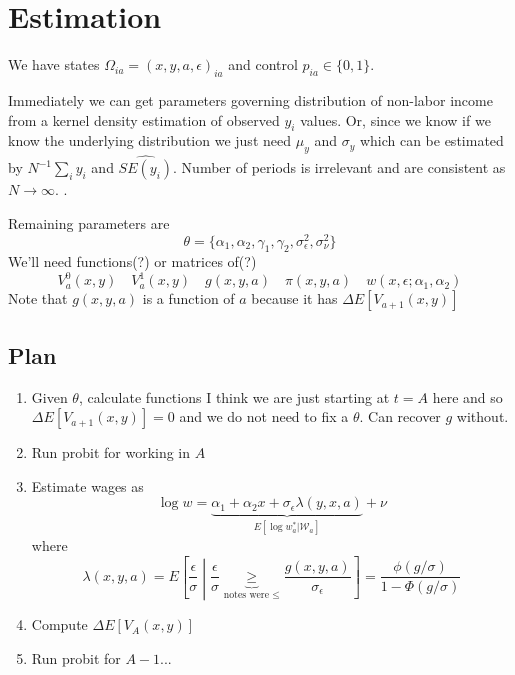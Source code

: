 \documentclass[11pt,letterpaper]{article}
\begin{document}
\section{Estimation}

We have states $\Omega_{ia} = (x,y,a,\epsilon)_{ia}$ and control $p_{ia} \in \{0,1\}$. 

Immediately we can get parameters governing distribution of non-labor income from a kernel density estimation of observed $y_i$ values. Or, since we know if we know the underlying distribution we just need $\mu_y$ and $\sigma_y$ which can be estimated by $N^{-1}\sum\nolimits_i y_i$ and $\widehat{SE(y_i)}$. Number of periods is irrelevant and are consistent as $N\rightarrow \infty$. .

Remaining parameters are
\[
\theta = \{ \alpha_1, \alpha_2, \gamma_1, \gamma_2, \sigma_\epsilon^2, \sigma^2_\nu \}
\]
We'll need functions(?) or matrices of(?)
\[
V_a^0(x,y) \quad V_a^1(x,y) \quad g(x,y,a) \quad \pi(x,y,a) \quad w(x,\epsilon; \alpha_1, \alpha_2)
\]
Note that $g(x,y,a)$ is a function of $a$ because it has $\Delta E[V_{a+1}(x,y)]$

\subsection{Plan}
\begin{enumerate}
    \item Given $\theta$, calculate functions {\color{cyan} I think we are just starting at $t=A$ here and so $\Delta E[V_{a+1}(x,y)] = 0$ and we do not need to fix a $\theta$. Can recover $g$ without.}
    \item Run probit for working in $A$
    \item Estimate wages as 
    \[
        \log w = \underbrace{\alpha_1 + \alpha_2 x + \sigma_\epsilon \lambda(y,x,a)}_{E[\log w_a^* | \mathcal W_a]} + \nu
    \] 
    where
    \[
        \lambda(x,y,a) = E\left[\frac{\epsilon}{\sigma} \middle | \frac{\epsilon}{\sigma} \underbrace{\geq}_{\text{notes were } \leq} \frac{g(x,y,a)}{\sigma_\epsilon}\right]
        = \frac{\phi(g/\sigma)}{1- \Phi(g/\sigma)}
    \]
    \item Compute $\Delta E[V_A(x,y)]$
    \item Run probit for $A-1$...
\end{enumerate}
\end{document}
